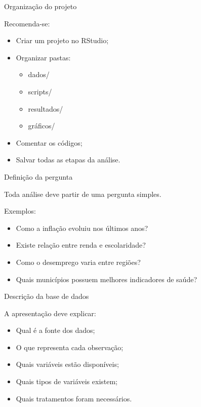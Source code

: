 \documentclass[11pt]{beamer}
\begin{document}
	\begin{frame}{Organização do projeto}
		
		Recomenda-se:
		
		\begin{itemize}
			\item Criar um projeto no RStudio;
			\item Organizar pastas:
			\begin{itemize}
				\item dados/
				\item scripts/
				\item resultados/
				\item gráficos/
			\end{itemize}
			\item Comentar os códigos;
			\item Salvar todas as etapas da análise.
		\end{itemize}
		
	\end{frame}
	
	\begin{frame}{Definição da pergunta}
		
		Toda análise deve partir de uma pergunta simples.
		
		\vspace{0.3cm}
		
		Exemplos:
		
		\begin{itemize}
			\item Como a inflação evoluiu nos últimos anos?
			\item Existe relação entre renda e escolaridade?
			\item Como o desemprego varia entre regiões?
			\item Quais municípios possuem melhores indicadores de saúde?
		\end{itemize}
		
	\end{frame}
	
	\begin{frame}{Descrição da base de dados}
		
		A apresentação deve explicar:
		
		\begin{itemize}
			\item Qual é a fonte dos dados;
			\item O que representa cada observação;
			\item Quais variáveis estão disponíveis;
			\item Quais tipos de variáveis existem;
			\item Quais tratamentos foram necessários.
		\end{itemize}
		
	\end{frame}
	
\end{document}
